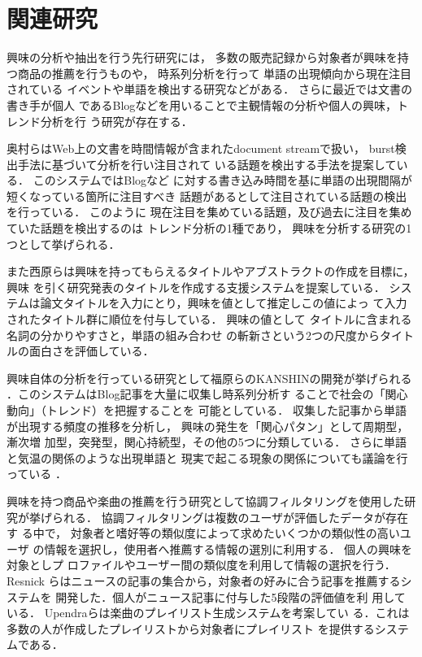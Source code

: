 \documentclass[japanese]{jnlp_1.4}
\begin{document}
\section{関連研究}\label{sec_関連}

興味の分析や抽出を行う先行研究には，
多数の販売記録から対象者が興味を持つ商品の推薦を行うものや，
時系列分析を行って
単語の出現傾向から現在注目されている
イベントや単語を検出する研究などがある．
さらに最近では文書の書き手が個人
であるBlogなどを用いることで主観情報の分析や個人の興味，トレンド分析を行
う研究が存在する．

奥村らはWeb上の文書を時間情報が含まれたdocument streamで扱い，
burst検出手法に基づいて分析を行い注目されて
いる話題を検出する手法を提案している{\cite{fuziki}}．
このシステムではBlogなど
に対する書き込み時間を基に単語の出現間隔が短くなっている箇所に注目すべき
話題があるとして注目されている話題の検出を行っている．
このように
現在注目を集めている話題，及び過去に注目を集めていた話題を検出するのは
トレンド分析の1種であり，
興味を分析する研究の1つとして挙げられる．


また西原らは興味を持ってもらえるタイトルやアブストラクトの作成を目標に，興味
を引く研究発表のタイトルを作成する支援システムを提案している\cite{nishihara}．
システムは論文タイトルを入力にとり，興味を値として推定しこの値によっ
て入力されたタイトル群に順位を付与している．
興味の値として
タイトルに含まれる名詞の分かりやすさと，単語の組み合わせ
の斬新さという2つの尺度からタイトルの面白さを評価している．

興味自体の分析を行っている研究として福原らのKANSHINの開発が挙げられる
\cite{fukuhara2}．このシステムはBlog記事を大量に収集し時系列分析す
ることで社会の{「関心動向」（トレンド）}を把握することを
可能としている．
収集した記事から単語が出現する頻度の推移を分析し，
興味の発生を{「関心パタン」}として周期型，漸次増
加型，突発型，関心持続型，その他の5つに分類している．
さらに単語と気温の関係のような出現単語と
現実で起こる現象の関係についても議論を行っている
\cite{fukuhara2005acp}．

興味を持つ商品や楽曲の推薦を行う研究として協調フィルタリングを使用した研
究が挙げられる．
協調フィルタリングは複数のユーザが評価したデータが存在す
る中で，
対象者と嗜好等の類似度によって求めたいくつかの類似性の高いユーザ
の情報を選択し，使用者へ推薦する情報の選別に利用する．
個人の興味を対象としプ
ロファイルやユーザー間の類似度を利用して情報の選択を行う．Resnick
らはニュースの記事の集合から，対象者の好みに合う記事を推薦するシステムを
開発した\cite{Resnick}．個人がニュース記事に付与した5段階の評価値を利
用している．
Upendraらは楽曲のプレイリスト生成システムを考案してい
る\cite{Upendra}．これは多数の人が作成したプレイリストから対象者にプレイリスト
を提供するシステムである．
\end{document}
